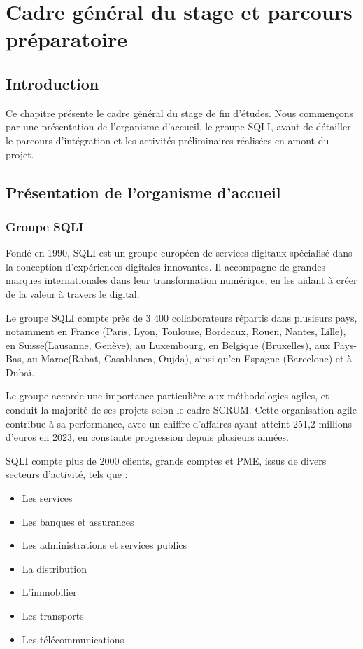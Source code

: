 \chapter{Cadre général du stage et parcours préparatoire}
    
\lfoot{\leftmark}

\section{Introduction}
Ce chapitre présente le cadre général du stage de fin d'études. Nous commençons par une présentation de l'organisme d'accueil, le groupe SQLI, avant de détailler le parcours d'intégration et les activités préliminaires réalisées en amont du projet.

\section{Présentation de l'organisme d'accueil}
\subsection{Groupe SQLI}
Fondé en 1990, SQLI est un groupe européen de services digitaux spécialisé dans la conception d’expériences digitales innovantes. Il accompagne de grandes marques internationales dans leur transformation numérique, en les aidant à créer de la valeur à travers le digital.

Le groupe SQLI compte près de 3 400 collaborateurs répartis dans plusieurs pays, notamment en France (Paris, Lyon, Toulouse, Bordeaux, Rouen, Nantes, Lille), en Suisse(Lausanne, Genève), au Luxembourg, en Belgique (Bruxelles), aux Pays-Bas, au Maroc(Rabat, Casablanca, Oujda), ainsi qu’en Espagne (Barcelone) et à Dubaï.

Le groupe accorde une importance particulière aux méthodologies agiles, et conduit la majorité de ses projets selon le cadre SCRUM. Cette organisation agile contribue à sa performance, avec un chiffre d’affaires ayant atteint 251,2 millions d’euros en 2023, en constante progression depuis plusieurs années. \cite{logo:sqli1}

SQLI compte plus de 2000 clients, grands comptes et PME, issus de divers secteurs d’activité, tels que :
\begin{itemize}
    \item Les services
    \item Les banques et assurances
    \item Les administrations et services publics
    \item La distribution
    \item L’immobilier
    \item Les transports
    \item Les télécommunications
\end{itemize}


